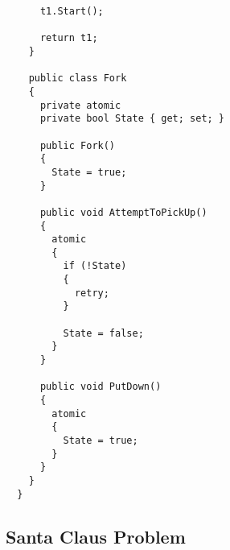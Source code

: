 \begin{lstlisting}
      t1.Start();

      return t1;
    }

    public class Fork
    {
      private atomic 
      private bool State { get; set; }

      public Fork()
      {
        State = true;
      }

      public void AttemptToPickUp()
      {
        atomic
        {
          if (!State)
          {
            retry;
          }

          State = false;
        }
      }

      public void PutDown()
      {
        atomic
        {
          State = true;
        }
      }
    }
  }

\end{lstlisting}
\subsection{Santa Claus Problem}
